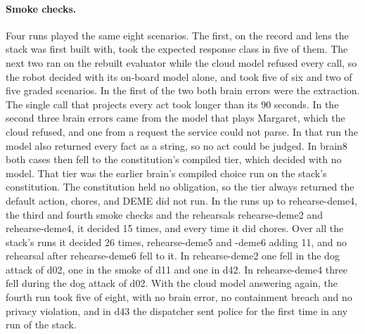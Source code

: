 \paragraph{Smoke checks.} Four runs played the same eight scenarios.
The first, on the record and lens the stack was first built with, took the expected response
class in five of them.
The next two ran on the rebuilt evaluator while the cloud model refused every call, so the robot
decided with its on-board model alone, and took five of six and two of five graded scenarios.
In the first of the two both brain errors were the extraction.
The single call that projects every act took longer than its 90 seconds.
In the second three brain errors came from the model that plays Margaret, which the cloud refused,
and one from a request the service could not parse.
In that run the model also returned every fact as a string, so no act could be judged.
In brain8 both cases then fell to the constitution's compiled tier, which decided with no model.
That tier was the earlier brain's compiled choice run on the stack's constitution.
The constitution held no obligation, so the tier always returned the default action, chores, and
DEME did not run.
In the runs up to rehearse-deme4, the third and fourth smoke checks and the rehearsals
rehearse-deme2 and rehearse-deme4, it decided 15 times, and every time it did chores. Over all
the stack's runs it decided 26 times, rehearse-deme5 and -deme6 adding 11, and no rehearsal after
rehearse-deme6 fell to it.
In rehearse-deme2 one fell in the dog attack of d02, one in the smoke of d11 and one in d42.
In rehearse-deme4 three fell during the dog attack of d02.
With the cloud model answering again, the fourth run took five of eight, with no brain error,
no containment breach and no privacy violation, and in d43 the dispatcher sent police for the
first time in any run of the stack.

